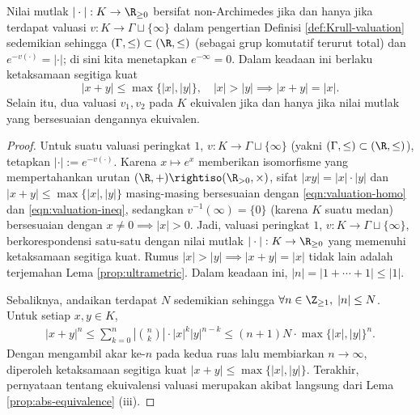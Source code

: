 \begin{proposition}\label{prop:abs-valuation}
	Nilai mutlak $|\cdot|: K \to \R_{\geq 0}$ bersifat non-Archimedes jika dan hanya jika terdapat valuasi $v: K \to \Gamma \sqcup \{\infty\}$ dalam pengertian Definisi \ref{def:Krull-valuation} sedemikian sehingga $(\Gamma, \leq) \subset (\R, \leq)$ (sebagai grup komutatif terurut total) dan $e^{-v(\cdot)} = |\cdot|$; di sini kita menetapkan $e^{-\infty}=0$. Dalam keadaan ini berlaku ketaksamaan segitiga kuat
	\[ |x+y| \leq \max\{ |x|, |y| \}, \quad |x|>|y| \implies |x+y|=|x|. \]
	Selain itu, dua valuasi $v_1, v_2$ pada $K$ ekuivalen jika dan hanya jika nilai mutlak yang bersesuaian dengannya ekuivalen.
\end{proposition}
\begin{proof}
	Untuk suatu valuasi peringkat $1$, $v: K \to \Gamma \sqcup\{\infty\}$ (yakni $(\Gamma, \leq) \subset (\R, \leq)$), tetapkan $|\cdot| := e^{-v(\cdot)}$. Karena $x \mapsto e^x$ memberikan isomorfisme yang mempertahankan urutan $(\R, +) \rightiso (\R_{>0}, \times)$, sifat $|xy|=|x| \cdot |y|$ dan $|x+y| \leq \max\{|x|,|y|\}$ masing-masing bersesuaian dengan \eqref{eqn:valuation-homo} dan \eqref{eqn:valuation-ineq}, sedangkan $v^{-1}(\infty)=\{0\}$ (karena $K$ suatu medan) bersesuaian dengan $x \neq 0 \implies |x| > 0$. Jadi, valuasi peringkat $1$, $v: K \to \Gamma \sqcup \{\infty\}$, berkorespondensi satu-satu dengan nilai mutlak $|\cdot|: K \to \R_{\geq 0}$ yang memenuhi ketaksamaan segitiga kuat. Rumus $|x|>|y| \implies |x+y|=|x|$ tidak lain adalah terjemahan Lema \ref{prop:ultrametric}. Dalam keadaan ini, $|n| = |1+ \cdots + 1| \leq |1|$.
	
	Sebaliknya, andaikan terdapat $N$ sedemikian sehingga $\forall n \in \Z_{\geq 1}, \; |n| \leq N$. Untuk setiap $x,y \in K$,
	\begin{gather*}
		|x+y|^n \leq \sum_{k=0}^n \left| \binom{n}{k}  \right| \cdot |x|^k |y|^{n-k} \leq (n+1)N \cdot \max\{|x|,|y|\}^n.
	\end{gather*}
	Dengan mengambil akar ke-$n$ pada kedua ruas lalu membiarkan $n \to \infty$, diperoleh ketaksamaan segitiga kuat $|x+y| \leq \max\{|x|,|y|\}$. Terakhir, pernyataan tentang ekuivalensi valuasi merupakan akibat langsung dari Lema \ref{prop:abs-equivalence} (iii).
\end{proof}

